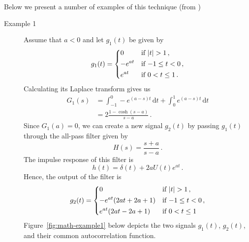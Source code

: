 Below we present a number of examples of this technique (from
)
\begin{description}
\item[Example 1]
  Assume that $a < 0$ and let $g_{1}(t)$ be given by
  \begin{equation}
    \label{eq:27}
    g_{1}(t) =
    \begin{dcases}
      0 & \text{if $|t| >1$}\,,\\
      -e^{at} & \text{if $-1\leq t < 0$}\,,\\
      e^{at} & \text{if $0 < t \leq 1$}\,.
    \end{dcases}
  \end{equation}
  Calculating its Laplace transform gives us
  \begin{equation}
    \label{eq:113}
    \begin{split}
      G_{1}(s)
      & = \int_{-1}^{0}-e^{(a-s)t}\,\mathrm{d}t +
      \int_{0}^{1}e^{(a-s)t}\,\mathrm{d}t \\
      & = 2\frac{1-\cosh(s-a)}{s-a}\,.
    \end{split}
  \end{equation}
  Since $G_{1}(a)=0$, we can create a new signal $g_{2}(t)$ by passing
  $g_{1}(t)$ through the all-pass filter given by
  \begin{equation}
    \label{eq:36}
    H(s) = \frac{s+a}{s-a}\,.
  \end{equation}
  The impulse response of this filter is
  \begin{equation}
    \label{eq:37}
    h(t) = \delta(t) + 2aU(t)e^{at}\,.
  \end{equation}
  Hence, the output of the filter is
  \begin{equation}
    \label{eq:38}
    g_{2}(t) =
    \begin{dcases}
      0  & \text{if $|t| > 1$}\,,\\
      -e^{at}(2at+2a+1) & \text{if $-1\leq t < 0$}\,,\\
      e^{at}(2at-2a+1) & \text{if $ 0 < t \leq 1$}
    \end{dcases}
  \end{equation}
  Figure~\ref{fig:math-example1} below depicts the two signals
  $g_{1}(t)$, $g_{2}(t)$, and their common autocorrelation function.
  \begin{figure}[H]
    \centering
    \qquad{}
\end{figure}
\end{description}
